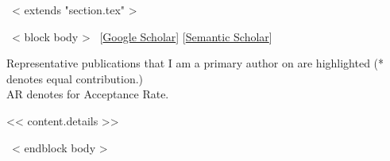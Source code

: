 ~< extends "section.tex" >~

~< block body >~
\vspace{-8.2mm}\hspace{30mm}[\href{https://scholar.google.com/citations?user=<< scholar_id >>}{Google Scholar}]
[\href{https://www.semanticscholar.org/author/<< semantic_id >>}{Semantic Scholar}]
\vspace{2mm}

Representative publications that I am a primary author on are
\colorbox{tab_highlight}{highlighted} (* denotes equal contribution.)
\\
AR denotes for Acceptance Rate.


<< content.details >>

~< endblock body >~